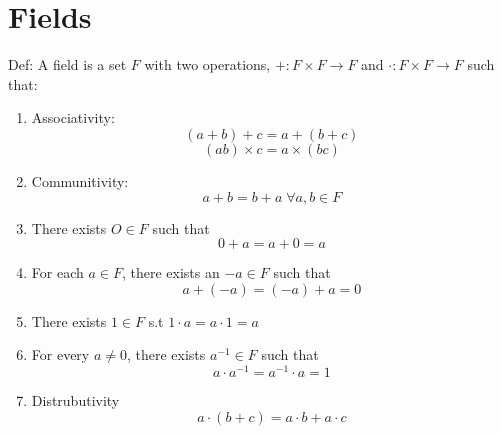 \documentclass[a4paper, notitlepage]{report}
\theoremstyle{remark}
\theoremstyle{definition}
\begin{document}
            \section{Fields}
            Def: A field is a set $F$ with two operations, $+: F \times F \rightarrow F$ and $\cdot : F \times F \rightarrow F$ such that:\\
	    \begin{enumerate}
	      \item Associativity:
            $$(a+b) + c = a + (b+c)$$
            $$(ab)\times c = a \times (bc)$$
	  \item Communitivity:
	      $$a+b = b+a \; \forall a,b \in F$$
	    \item There exists $O \in F$ such that 
	      $$0+a= a+0 = a$$
	    \item For each $a\in F$, there exists an $-a \in F$ such that 
            $$a + (-a) = (-a) + a = 0$$
	  \item There exists $1 \in F$ s.t $1\cdot a = a \cdot 1 = a$ 
	  \item For every $a \neq 0$, there exists $a^{-1} \in F$ such that 
            $$a\cdot a^{-1} = a^{-1} \cdot a = 1$$
	  \item  Distrubutivity
            $$a\cdot(b+c) = a\cdot b + a \cdot c$$

	    \end{enumerate}
	    
\end{document}
